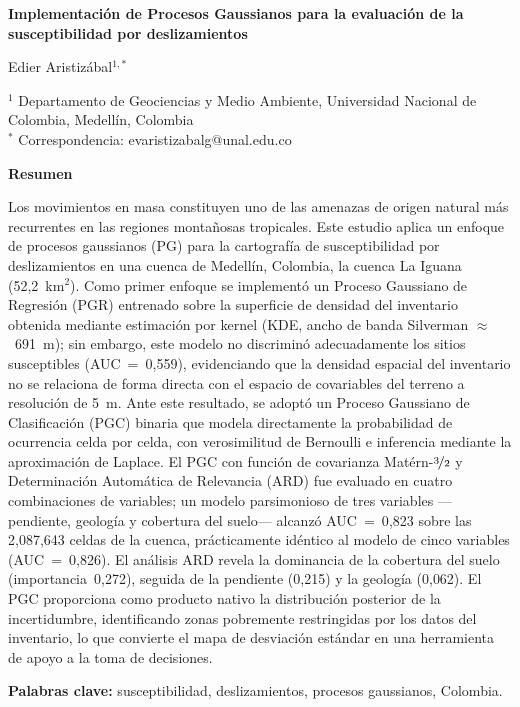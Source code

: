 \documentclass[12pt, a4paper]{article}
\begin{document}
\begin{titlepage}
\begin{center}

\vspace*{2cm}

{\LARGE\bfseries
Implementación de Procesos Gaussianos para la evaluación de la susceptibilidad por deslizamientos
\par}

\vspace{1.5cm}
{\large Edier Aristizábal$^{1,*}$\par}

\vspace{0.8cm}
{\normalsize
$^1$ Departamento de Geociencias y Medio Ambiente,
Universidad Nacional de Colombia, Medellín, Colombia\\[0.3cm]
$^*$ Correspondencia: evaristizabalg@unal.edu.co
}

\end{center}

\vspace{1.5cm}
\noindent\textbf{Resumen}

\noindent
Los movimientos en masa constituyen uno de las amenazas de origen natural más recurrentes en las regiones montañosas tropicales. 
Este estudio aplica un enfoque de procesos gaussianos (PG) para la cartografía de susceptibilidad por deslizamientos en una cuenca de
Medellín, Colombia, la cuenca La Iguana (52{,}2~km$^2$). Como primer enfoque se implementó un Proceso Gaussiano de Regresión (PGR)
entrenado sobre la superficie de densidad del inventario obtenida mediante estimación por kernel (KDE, ancho de banda
Silverman $\approx$~691~m); sin embargo, este modelo no discriminó adecuadamente los sitios susceptibles (AUC~=~0{,}559),
evidenciando que la densidad espacial del inventario no se relaciona de forma directa con el espacio de covariables del
terreno a resolución de 5~m. Ante este resultado, se adoptó un Proceso Gaussiano de Clasificación (PGC) binaria que modela
directamente la probabilidad de ocurrencia celda por celda, con verosimilitud de Bernoulli e inferencia mediante la
aproximación de Laplace. El PGC con función de covarianza Matérn-$\nicefrac{3}{2}$ y Determinación Automática de Relevancia (ARD) fue
evaluado en cuatro combinaciones de variables; un modelo parsimonioso de tres variables ---pendiente, geología y cobertura del
suelo--- alcanzó AUC~=~0{,}823 sobre las 2{,}087{,}643 celdas de la cuenca, prácticamente idéntico al modelo de cinco
variables (AUC~=~0{,}826). El análisis ARD revela la dominancia de la cobertura del suelo (importancia~0{,}272), seguida de la
pendiente (0{,}215) y la geología (0{,}062). El PGC proporciona como producto nativo la distribución posterior de la
incertidumbre, identificando zonas pobremente restringidas por los datos del inventario, lo que convierte el mapa de desviación estándar
en una herramienta de apoyo a la toma de decisiones.

\vspace{0.5cm}
\noindent\textbf{Palabras clave:} susceptibilidad, deslizamientos, procesos gaussianos, Colombia.

\end{titlepage}
\end{document}
